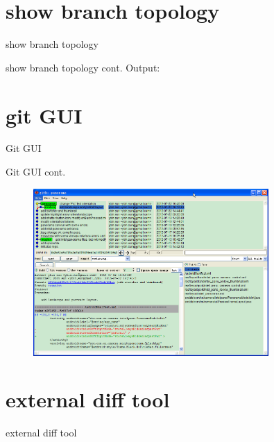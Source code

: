 ﻿\documentclass{beamer}
\begin{document}
\section[show branch topology]{show branch topology}
\begin{frame}{show branch topology}
\end{frame}

\begin{frame}{show branch topology cont.}
  \textcolor{blue!50}{\ttfamily Output:}
  
\end{frame}

\section[git GUI]{git GUI}
\begin{frame}{Git GUI}
\end{frame}

\begin{frame}{Git GUI cont.}
\begin{figure}
  \centering
  \includegraphics[width=0.8\textwidth]{picturedir/gitk.png}%
\end{figure}
\end{frame}

\section[external diff tool]{external diff tool}
\begin{frame}{external diff tool}
\end{frame}
\end{document}
